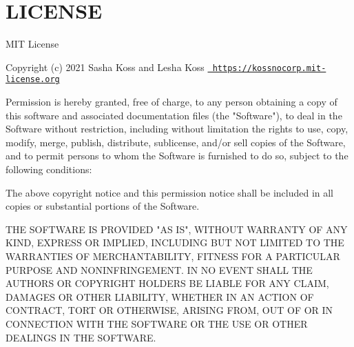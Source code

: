 \chapter{LICENSE}
\hypertarget{md__2home_2solype_2delivery_2current__days_2trello_2front_2node__modules_2date-fns_2LICENSE}{}\label{md__2home_2solype_2delivery_2current__days_2trello_2front_2node__modules_2date-fns_2LICENSE}
MIT License

Copyright (c) 2021 Sasha Koss and Lesha Koss \href{https://kossnocorp.mit-license.org}{\texttt{ https\+://kossnocorp.\+mit-\/license.\+org}}

Permission is hereby granted, free of charge, to any person obtaining a copy of this software and associated documentation files (the "{}\+Software"{}), to deal in the Software without restriction, including without limitation the rights to use, copy, modify, merge, publish, distribute, sublicense, and/or sell copies of the Software, and to permit persons to whom the Software is furnished to do so, subject to the following conditions\+:

The above copyright notice and this permission notice shall be included in all copies or substantial portions of the Software.

THE SOFTWARE IS PROVIDED "{}\+AS IS"{}, WITHOUT WARRANTY OF ANY KIND, EXPRESS OR IMPLIED, INCLUDING BUT NOT LIMITED TO THE WARRANTIES OF MERCHANTABILITY, FITNESS FOR A PARTICULAR PURPOSE AND NONINFRINGEMENT. IN NO EVENT SHALL THE AUTHORS OR COPYRIGHT HOLDERS BE LIABLE FOR ANY CLAIM, DAMAGES OR OTHER LIABILITY, WHETHER IN AN ACTION OF CONTRACT, TORT OR OTHERWISE, ARISING FROM, OUT OF OR IN CONNECTION WITH THE SOFTWARE OR THE USE OR OTHER DEALINGS IN THE SOFTWARE. 